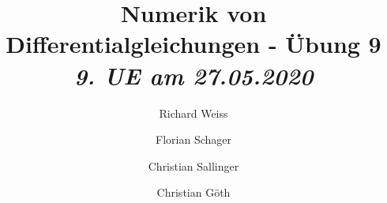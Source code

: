 \documentclass{article}
\title
{
  Numerik von Differentialgleichungen - Übung 9 \\
  \vspace{4pt}
  \normalsize
  \textit{9. UE am 27.05.2020}
}
\author
{
  Richard Weiss       \and
  Florian Schager     \and
  Christian Sallinger \and
  Christian Göth
}
\date{}
\begin{document}
\renewcommand{\figurename}{Abbildung}
\maketitle


\pagebreak




\end{document}
